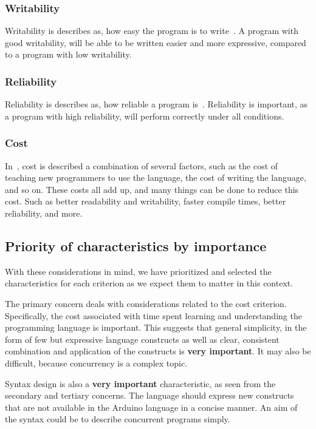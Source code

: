 \subsubsection{Writability}
Writability is describes as, how easy the program is to write~\cite{Sebesta2016}. A program with good writability, will be able to be written easier and more expressive, compared to a program with low writability.

\subsubsection{Reliability}
Reliability is describes as, how reliable a program is~\cite{Sebesta2016}. Reliability is important, as a program with high reliability, will perform correctly under all conditions.

\subsubsection{Cost}
In~, cost is described a combination of several factors, such as the cost of teaching new programmers to use the language, the cost of writing the language, and so on. These costs all add up, and many things can be done to reduce this cost. Such as better readability and writability, faster compile times, better reliability, and more.

\subsection{Priority of characteristics by importance}
With these considerations in mind, we have prioritized and selected the characteristics for each criterion as we expect them to matter in this context.

The primary concern deals with considerations related to the cost criterion. Specifically, the cost associated with time spent learning and understanding the programming language is important. This suggests that general simplicity, in the form of few but expressive language constructs as well as clear, consistent combination and application of the constructs is \textbf{very important}. It may also be difficult, because concurrency is a complex topic.

Syntax design is also a \textbf{very important} characteristic, as seen from the secondary and tertiary concerns. The language should express new constructs that are not available in the Arduino language in a concise manner. An aim of the syntax could be to describe concurrent programs simply.

